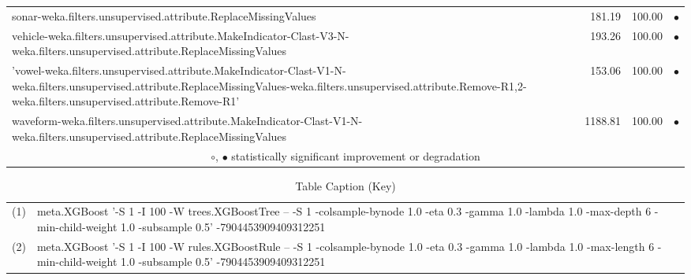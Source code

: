 \begin{table}[thb]
{\begin{tabular}{lrr@{\hspace{0.1cm}}c}
sonar-weka.filters.unsupervised.attribute.ReplaceMissingValues &  181.19 & 100.00 & $\bullet$\\
vehicle-weka.filters.unsupervised.attribute.MakeIndicator-Clast-V3-N-weka.filters.unsupervised.attribute.ReplaceMissingValues &  193.26 & 100.00 & $\bullet$\\
'vowel-weka.filters.unsupervised.attribute.MakeIndicator-Clast-V1-N-weka.filters.unsupervised.attribute.ReplaceMissingValues-weka.filters.unsupervised.attribute.Remove-R1,2-weka.filters.unsupervised.attribute.Remove-R1' &  153.06 & 100.00 & $\bullet$\\
waveform-weka.filters.unsupervised.attribute.MakeIndicator-Clast-V1-N-weka.filters.unsupervised.attribute.ReplaceMissingValues & 1188.81 & 100.00 & $\bullet$\\
\hline
\multicolumn{4}{c}{$\circ$, $\bullet$ statistically significant improvement or degradation}\\
\end{tabular} \footnotesize \par}
\end{table}


\begin{table}[thb]
\caption{\label{labelname}Table Caption (Key)}
\scriptsize
{\centering
\begin{tabular}{cl}\\
(1) & meta.XGBoost '-S 1 -I 100 -W trees.XGBoostTree -- -S 1 -colsample-bynode 1.0 -eta 0.3 -gamma 1.0 -lambda 1.0 -max-depth 6 -min-child-weight 1.0 -subsample 0.5' -7904453909409312251 \\
(2) & meta.XGBoost '-S 1 -I 100 -W rules.XGBoostRule -- -S 1 -colsample-bynode 1.0 -eta 0.3 -gamma 1.0 -lambda 1.0 -max-length 6 -min-child-weight 1.0 -subsample 0.5' -7904453909409312251 \\
\end{tabular}
}
\end{table}

